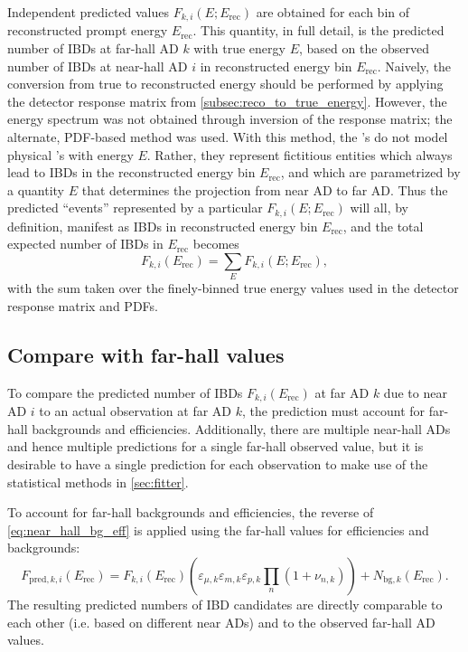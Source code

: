 Independent predicted values $F_{k,i}(E;E_\text{rec})$ are obtained
for each bin of reconstructed prompt energy $E_\text{rec}$.
This quantity, in full detail,
is the predicted number of IBDs at far-hall AD $k$
with true \nuebar{} energy $E$,
based on the observed number of IBDs at near-hall AD $i$
in reconstructed energy bin $E_\text{rec}$.
Naively, the conversion from true to reconstructed energy
should be performed by applying the detector response matrix
from \cref{subsec:reco_to_true_energy}.
However, the \nuebar{} energy spectrum was not obtained
through inversion of the response matrix;
the alternate, PDF-based method was used.
With this method, the \nuebar{}'s do not model physical \nuebar{}'s with energy $E$.
Rather, they represent fictitious entities which always
lead to IBDs in the reconstructed energy bin $E_\text{rec}$,
and which are parametrized by a quantity $E$ that determines
the projection from near AD to far AD.
Thus the predicted ``events'' represented by a particular
$F_{k,i}(E;E_\text{rec})$ will all, by definition,
manifest as IBDs in reconstructed energy bin $E_\text{rec}$,
and the total expected number of IBDs in $E_\text{rec}$ becomes
\begin{equation}
    F_{k,i}(E_\text{rec}) = \sum_E F_{k,i}(E; E_\text{rec}),
\end{equation}
with the sum taken over the finely-binned true energy values
used in the detector response matrix and PDFs.

\subsection{Compare with far-hall values}
\label{subsec:far_bg_eff}

To compare the predicted number of IBDs $F_{k,i}(E_\text{rec})$
at far AD $k$ due to near AD $i$
to an actual observation at far AD $k$,
the prediction must account for far-hall backgrounds and efficiencies.
Additionally, there are multiple near-hall ADs
and hence multiple predictions for a single far-hall observed value,
but it is desirable to have a single prediction for each observation
to make use of the statistical methods in \cref{sec:fitter}.

To account for far-hall backgrounds and efficiencies,
the reverse of \cref{eq:near_hall_bg_eff} is applied
using the far-hall values for efficiencies and backgrounds:
\begin{equation}
    F_{\text{pred},k,i}(E_\text{rec}) = F_{k,i}(E_\text{rec})\left(
        \varepsilon_{\mu,k}\varepsilon_{m,k}\varepsilon_{p,k}
        \prod_n(1 + \nu_{n,k})
    \right)
    + N_{\text{bg},k}(E_\text{rec}).
\end{equation}
The resulting predicted numbers of IBD candidates
are directly comparable to each other (i.e. based on different near ADs)
and to the observed far-hall AD values.

